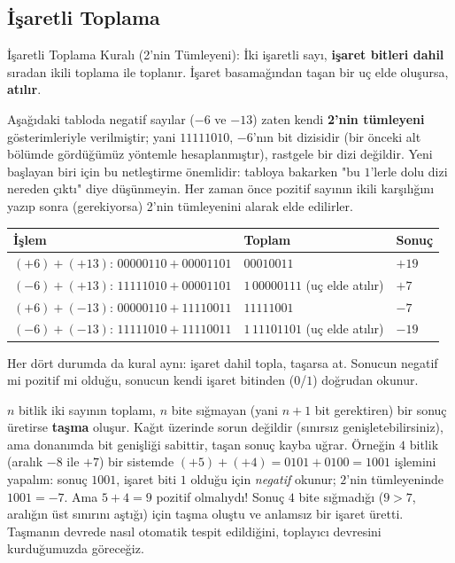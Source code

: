\subsection{İşaretli Toplama}
\label{sec:isaretli-toplama}

\begin{tanim}{İşaretli Toplama Kuralı (2'nin Tümleyeni):}
İki işaretli sayı, \textbf{işaret bitleri dahil} sıradan ikili toplama ile toplanır. İşaret
basamağından taşan bir uç elde oluşursa, \textbf{atılır}.
\end{tanim}

\begin{ornek}
Aşağıdaki tabloda negatif sayılar (\emph{$-6$} ve \emph{$-13$}) zaten kendi \textbf{2'nin
tümleyeni} gösterimleriyle verilmiştir; yani $11111010$, $-6$'nın bit dizisidir (bir önceki
alt bölümde gördüğümüz yöntemle hesaplanmıştır), rastgele bir dizi değildir. Yeni başlayan
biri için bu netleştirme önemlidir: tabloya bakarken "bu $1$'lerle dolu dizi nereden çıktı"
diye düşünmeyin. Her zaman önce pozitif sayının ikili karşılığını yazıp sonra (gerekiyorsa)
2'nin tümleyenini alarak elde edilirler.
\begin{center}
\begin{tabular}{lll}
\toprule
İşlem & Toplam & Sonuç \\
\midrule
$(+6)+(+13)$: $00000110+00001101$ & $00010011$ & $+19$ \\
$(-6)+(+13)$: $11111010+00001101$ & $1\,00000111$ (uç elde atılır) & $+7$ \\
$(+6)+(-13)$: $00000110+11110011$ & $11111001$ & $-7$ \\
$(-6)+(-13)$: $11111010+11110011$ & $1\,11101101$ (uç elde atılır) & $-19$ \\
\bottomrule
\end{tabular}
\end{center}
Her dört durumda da kural aynı: işaret dahil topla, taşarsa at. Sonucun negatif mi pozitif
mi olduğu, sonucun kendi işaret bitinden ($0$/$1$) doğrudan okunur.
\end{ornek}

\begin{bilginot}
$n$ bitlik iki sayının toplamı, $n$ bite sığmayan (yani $n{+}1$ bit gerektiren) bir sonuç
üretirse \textbf{taşma} oluşur. Kağıt üzerinde sorun değildir (sınırsız genişletebilirsiniz),
ama donanımda bit genişliği sabittir, taşan sonuç kayba uğrar. Örneğin $4$ bitlik
(aralık $-8$ ile $+7$) bir sistemde $(+5)+(+4)=0101+0100=1001$ işlemini yapalım: sonuç
$1001$, işaret biti $1$ olduğu için \emph{negatif} okunur; $2$'nin tümleyeninde
$1001=-7$. Ama $5+4=9$ pozitif olmalıydı! Sonuç $4$ bite sığmadığı ($9>7$, aralığın üst
sınırını aştığı) için taşma oluştu ve anlamsız bir işaret üretti. Taşmanın devrede nasıl
otomatik tespit edildiğini, toplayıcı devresini kurduğumuzda göreceğiz.
\end{bilginot}

